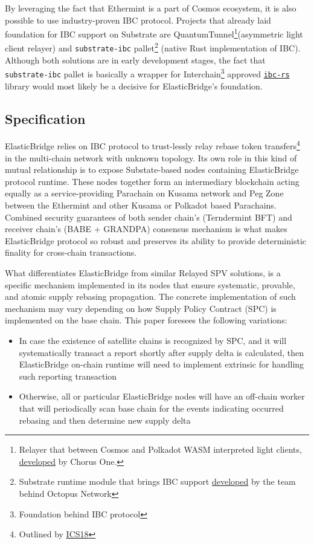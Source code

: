 \documentclass{article}
\begin{document}
By leveraging the fact that Ethermint is a part of Cosmos ecosystem, it is also possible to use industry-proven IBC protocol. Projects that already laid foundation for IBC support on Substrate are QuantumTunnel\footnote{Relayer that between Cosmos and Polkadot WASM interpreted light clients, \href{https://github.com/ChorusOne/quantum-tunnel}{developed} by Chorus One.}(asymmetric light client relayer) and \texttt{substrate-ibc} pallet\footnote{Substrate runtime module that brings IBC support \href{https://github.com/octopus-network/substrate-ibc}{developed} by the team behind Octopus Network} (native Rust implementation of IBC). Although both solutions are in early development stages, the fact that \texttt{substrate-ibc} pallet is basically a wrapper for Interchain\footnote{Foundation behind IBC protocol} approved \texttt{\href{https://github.com/informalsystems/ibc-rs}{ibc-rs}} library would most likely be a decisive for ElasticBridge's foundation.

\subsection{Specification}

ElasticBridge relies on IBC protocol to trust-lessly relay rebase token transfers\footnote{Outlined by \href{https://github.com/cosmos/ibc/tree/master/spec/relayer/ics-018-relayer-algorithms}{ICS18}} in the multi-chain network with unknown topology. Its own role in this kind of mutual relationship is to expose Substate-based nodes containing ElasticBridge protocol runtime. These nodes together form an intermediary blockchain acting equally as a service-providing Parachain on Kusama network and Peg Zone between the Ethermint and other Kusama or Polkadot based Parachains. Combined security guarantees of both sender chain's (Terndermint BFT) and receiver chain's (BABE + GRANDPA) consensus mechanism is what makes ElasticBridge protocol so robust and preserves its ability to provide deterministic finality for cross-chain transactions.

What differentiates ElasticBridge from similar Relayed SPV solutions, is a specific mechanism implemented in its nodes that ensure systematic, provable, and atomic supply rebasing propagation. The concrete implementation of such mechanism may vary depending on how Supply Policy Contract (SPC) is implemented on the base chain. This paper foresees the following variations:

\begin{itemize}%
  \renewcommand{\labelitemi}{$\Rightarrow$}
	\item In case the existence of satellite chains is recognized by SPC, and it will systematically transact a report shortly after supply delta is calculated, then ElasticBridge on-chain runtime will need to implement extrinsic for handling such reporting transaction
	\item Otherwise, all or particular ElasticBridge nodes will have an off-chain worker that will periodically scan base chain for the events indicating occurred rebasing and then determine new supply delta 
\end{itemize}
\end{document}
